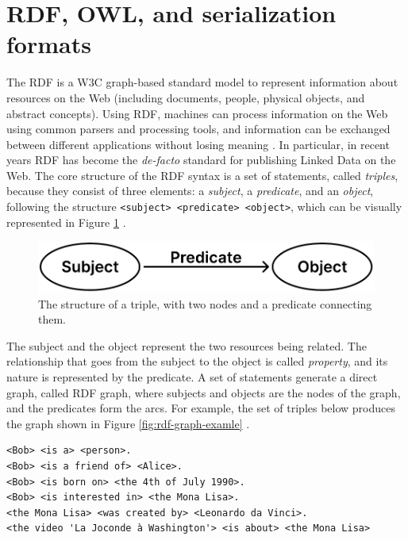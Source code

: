 \section{RDF, OWL, and serialization formats}
\label{sec:rdf-owl-formats}

The \acf{RDF} is a \ac{W3C} graph-based standard model to represent information about resources on the Web (including documents, people, physical objects, and abstract concepts). Using \ac{RDF}, machines can process information on the Web using common parsers and processing tools, and information can be exchanged between different applications without losing meaning \cite{world2014rdfprimer}. In particular, in recent years \ac{RDF} has become the \textit{de-facto} standard for publishing Linked Data on the Web. The core structure of the \ac{RDF} syntax is a set of statements, called \textit{triples}, because they consist of three elements: a \textit{subject}, a \textit{predicate}, and an \textit{object}, following the structure \verb#<subject> <predicate> <object>#, which can be visually represented in Figure \ref{fig:rdf-graph-structure} \cite{world2014rdfconcepts}.

\begin{figure}[!ht]
    \centering
    \includegraphics[width=0.55\columnwidth]{images/rdf-graph-structure.pdf}
    \caption{The structure of a triple, with two nodes and a predicate connecting them.}
    \label{fig:rdf-graph-structure}
\end{figure}

The subject and the object represent the two resources being related. The relationship that goes from the subject to the object is called \textit{property}, and its nature is represented by the predicate. A set of statements generate a direct graph, called RDF graph, where subjects and objects are the nodes of the graph, and the predicates form the arcs. For example, the set of triples below produces the graph shown in Figure \ref{fig:rdf-graph-examle} \cite{world2014rdfprimer}.

\begin{verbatim}
<Bob> <is a> <person>.
<Bob> <is a friend of> <Alice>.
<Bob> <is born on> <the 4th of July 1990>.
<Bob> <is interested in> <the Mona Lisa>.
<the Mona Lisa> <was created by> <Leonardo da Vinci>.
<the video 'La Joconde à Washington'> <is about> <the Mona Lisa>
\end{verbatim}

